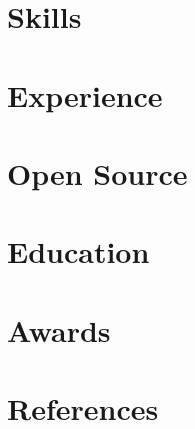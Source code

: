 \documentclass[a4paper]{resume}
\begin{document}
\def \sepspace {\vspace{1em}}
\makeheader{\contactemail}{\contactwebsite}{\contactphone}
\section{Skills}{\skillstechnical}
\section{Experience}{\experience}
\section{Open Source}{\projects}
\section{Education}{\education}
\section{Awards}{\awards}
\section{References}{}
\end{document}
